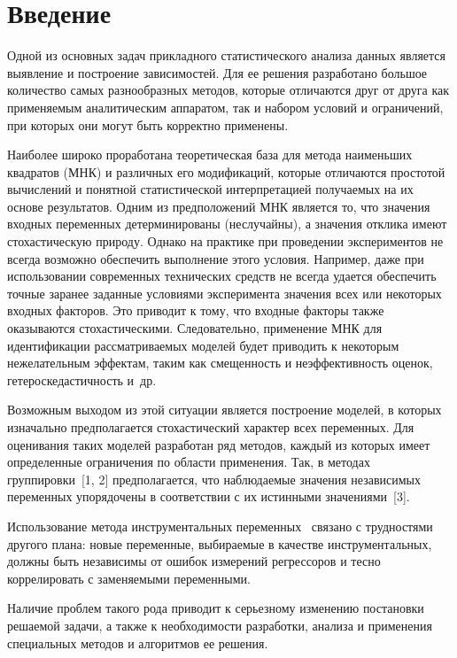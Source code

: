       \begin{multicols}{2}

            \label{st\stat}


\section{Введение}

  Одной из основных задач прикладного статистического анализа данных
является выявление и построение зависимостей. Для ее решения разработано
большое количество самых разнообразных методов, которые отличаются
друг от друга как применяемым аналитическим аппаратом, так и набором
условий и ограничений, при которых они могут быть корректно применены.

Наиболее широко проработана теоретическая база для метода наименьших
квадратов (МНК) и различных его модификаций, которые отличаются
простотой вычислений и понятной статистической интерпретацией
получаемых на их основе результатов. Одним из предположений МНК
является то, что значения входных переменных детерминированы
(неслучайны), а значения отклика имеют стохастическую природу. Однако
на практике при проведении экспериментов не всегда возможно обеспечить
выполнение этого условия. Например, даже при использовании современных
технических средств не всегда удается обеспечить точные заранее заданные
условиями эксперимента значения всех или некоторых входных факторов.
Это приводит к тому, что входные факторы также оказываются
стохастическими. Следовательно, применение МНК для идентификации
рассматриваемых моделей будет приводить к некоторым нежелательным
эффектам, таким как смещенность и неэффективность оценок,
гетероскедастичность и~др.

  Возможным выходом из этой ситуации является построение моделей, в
которых изначально предполагается стохастический характер всех
переменных. Для оценивания таких моделей разработан ряд методов,
каждый из которых имеет определенные ограничения по области
применения. Так, в методах группировки~[1, 2] предполагается, что
наблюдаемые значения независимых переменных упорядочены в
соответствии с их истинными значениями~[3]. 

Использование метода
инструментальных переменных~\cite{1-tim} связано с трудностями другого
плана: новые переменные, выбираемые в качестве инструментальных,
должны быть независимы от ошибок измерений регрессоров и тесно
коррелировать с заменяемыми переменными.

  Наличие проблем такого рода приводит к серь\-ез\-но\-му изменению
постановки решаемой задачи, а также к необходимости разработки, анализа
и применения специальных методов и алгоритмов ее решения.


\end{multicols}

